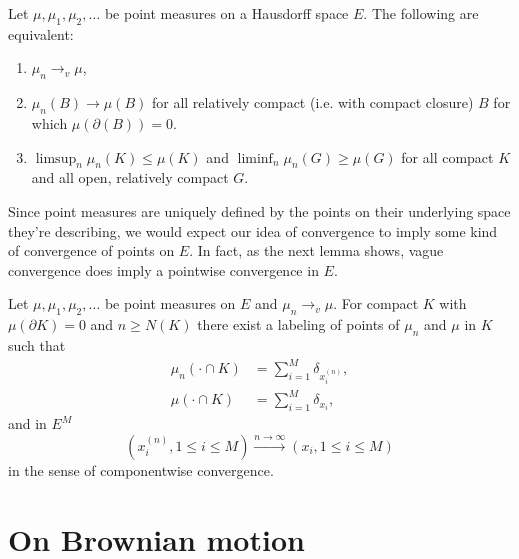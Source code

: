 \begin{lemma} \label{L: portmanteau vague}
	Let $\mu, \mu_1, \mu_2, \dots$ be point measures on a Hausdorff space $E$.
	The following are equivalent:
	\begin{enumerate}
		\item $\mu_n \rightarrow_v \mu$,
		\item $\mu_n(B) \rightarrow \mu(B)$ for all relatively compact (i.e. with compact closure) $B$ 
			for which $\mu(\partial(B)) = 0$.
		\item $\limsup_n \mu_n(K) \leq \mu(K)$ and $\liminf_n \mu_n(G) \geq \mu(G)$
			for all compact $K$ and all open, relatively compact $G$.
	\end{enumerate}
\end{lemma}

Since point measures are uniquely defined by the points on their underlying space they're describing,
we would expect our idea of convergence to imply some kind of convergence of points on $E$.
In fact, as the next lemma shows, vague convergence does imply a pointwise convergence in $E$.

\begin{lemma} \label{L: pointwise convergence}
	Let $\mu, \mu_1, \mu_2, \dots$ be point measures on $E$ and $\mu_n \rightarrow_v \mu$.
	For compact $K$ with $\mu(\partial K) = 0$ and $n \geq N(K)$
	there exist a labeling of points of $\mu_n$ and $\mu$ in $K$ such that
	\begin{equation}
	\begin{aligned}
		\mu_n(\cdot \cap K) &= \sum_{i=1}^{M} \delta_{x_i^{(n)}}, \\
		\mu(\cdot \cap K) &= \sum_{i=1}^{M} \delta_{x_i},
	\end{aligned}
	\end{equation}
	and in $E^M$
	\begin{equation}
		( x_i^{(n)}, 1 \leq i \leq M ) \xrightarrow{n \rightarrow \infty}
		( x_i, 1 \leq i \leq M  ) 
	\end{equation}
	in the sense of componentwise convergence.
\end{lemma}


\section{On Brownian motion}

